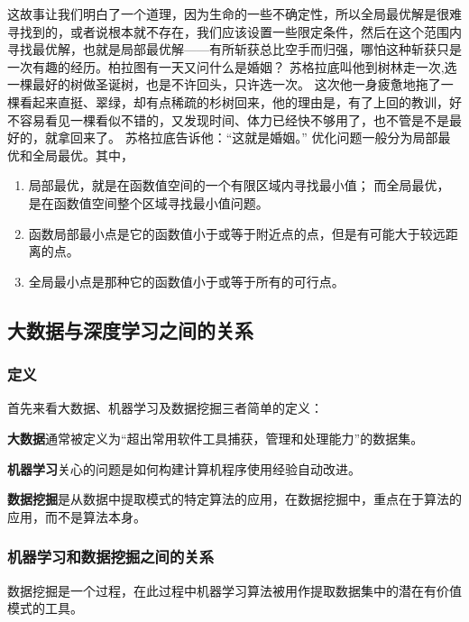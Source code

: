 这故事让我们明白了一个道理，因为生命的一些不确定性，所以全局最优解是很难寻找到的，或者说根本就不存在，我们应该设置一些限定条件，然后在这个范围内寻找最优解，也就是局部最优解------有所斩获总比空手而归强，哪怕这种斩获只是一次有趣的经历。
​
柏拉图有一天又问什么是婚姻？
苏格拉底叫他到树林走一次,选一棵最好的树做圣诞树，也是不许回头，只许选一次。
这次他一身疲惫地拖了一棵看起来直挺、翠绿，却有点稀疏的杉树回来，他的理由是，有了上回的教训，好不容易看见一棵看似不错的，又发现时间、体力已经快不够用了，也不管是不是最好的，就拿回来了。
苏格拉底告诉他：``这就是婚姻。''
​ 优化问题一般分为局部最优和全局最优。其中，
\begin{enumerate}
\item 局部最优，就是在函数值空间的一个有限区域内寻找最小值；
  而全局最优，是在函数值空间整个区域寻找最小值问题。
\item 函数局部最小点是它的函数值小于或等于附近点的点，但是有可能大于较远距离的点。
\item 全局最小点是那种它的函数值小于或等于所有的可行点。
\end{enumerate}

\subsection{大数据与深度学习之间的关系}
\label{ux5927ux6570ux636eux4e0eux6df1ux5ea6ux5b66ux4e60ux4e4bux95f4ux7684ux5173ux7cfb}
\subsubsection{定义}
首先来看大数据、机器学习及数据挖掘三者简单的定义：
\begin{defination}
\textbf{大数据}通常被定义为``超出常用软件工具捕获，管理和处理能力''的数据集。  
\end{defination}

\begin{defination}
\textbf{机器学习}关心的问题是如何构建计算机程序使用经验自动改进。  
\end{defination}
\begin{defination}
\textbf{数据挖掘}是从数据中提取模式的特定算法的应用，在数据挖掘中，重点在于算法的应用，而不是算法本身。  
\end{defination}

\subsubsection{\textbf{机器学习和数据挖掘}之间的关系}
数据挖掘是一个过程，在此过程中机器学习算法被用作提取数据集中的潜在有价值模式的工具。
